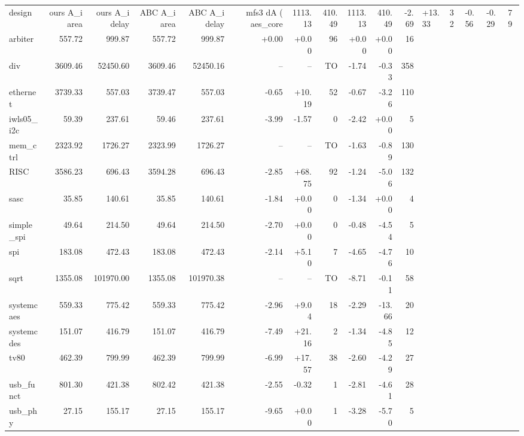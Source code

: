 \begin{tabular}{lrrrrrrrrrr}
  \toprule
  design & ours A\_i area & ours A\_i delay & ABC A\_i area & ABC A\_i delay & mfs3 dA (%
  \midrule
  aes\_core & 1113.13 & 410.49 & 1113.13 & 410.49 & -2.69 & +13.33 & 32 & -0.56 & -0.29 & 79 \\
  arbiter & 557.72 & 999.87 & 557.72 & 999.87 & +0.00 & +0.00 & 96 & +0.00 & +0.00 & 16 \\
  div & 3609.46 & 52450.60 & 3609.46 & 52450.16 & -- & -- & TO & -1.74 & -0.33 & 358 \\
  ethernet & 3739.33 & 557.03 & 3739.47 & 557.03 & -0.65 & +10.19 & 52 & -0.67 & -3.26 & 110 \\
  iwls05\_i2c & 59.39 & 237.61 & 59.46 & 237.61 & -3.99 & -1.57 & 0 & -2.42 & +0.00 & 5 \\
  mem\_ctrl & 2323.92 & 1726.27 & 2323.99 & 1726.27 & -- & -- & TO & -1.63 & -0.89 & 130 \\
  RISC & 3586.23 & 696.43 & 3594.28 & 696.43 & -2.85 & +68.75 & 92 & -1.24 & -5.06 & 132 \\
  sasc & 35.85 & 140.61 & 35.85 & 140.61 & -1.84 & +0.00 & 0 & -1.34 & +0.00 & 4 \\
  simple\_spi & 49.64 & 214.50 & 49.64 & 214.50 & -2.70 & +0.00 & 0 & -0.48 & -4.54 & 5 \\
  spi & 183.08 & 472.43 & 183.08 & 472.43 & -2.14 & +5.10 & 7 & -4.65 & -4.76 & 10 \\
  sqrt & 1355.08 & 101970.00 & 1355.08 & 101970.38 & -- & -- & TO & -8.71 & -0.11 & 58 \\
  systemcaes & 559.33 & 775.42 & 559.33 & 775.42 & -2.96 & +9.04 & 18 & -2.29 & -13.66 & 20 \\
  systemcdes & 151.07 & 416.79 & 151.07 & 416.79 & -7.49 & +21.16 & 2 & -1.34 & -4.85 & 12 \\
  tv80 & 462.39 & 799.99 & 462.39 & 799.99 & -6.99 & +17.57 & 38 & -2.60 & -4.29 & 27 \\
  usb\_funct & 801.30 & 421.38 & 802.42 & 421.38 & -2.55 & -0.32 & 1 & -2.81 & -4.61 & 28 \\
  usb\_phy & 27.15 & 155.17 & 27.15 & 155.17 & -9.65 & +0.00 & 1 & -3.28 & -5.70 & 5 \\
  \bottomrule
\end{tabular}

